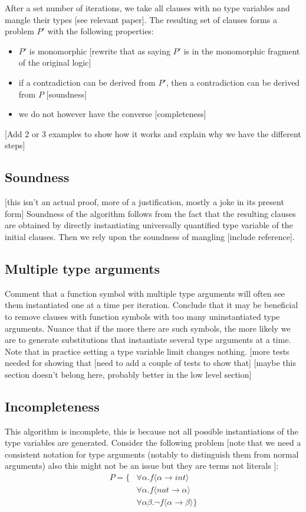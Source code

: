 \documentclass{article}
\begin{document}
After a set number of iterations, we take all clauses with no type variables and mangle their types [see relevant paper]. The resulting set of clauses forms a problem \(P'\) with the following properties:
\begin{itemize}
   \item \(P'\) is monomorphic [rewrite that as saying \(P'\) is in the monomorphic fragment of the original logic]
   \item if a contradiction can be derived from \(P'\), then a contradiction can be derived from \(P\) [soundness]
   \item we do not however have the converse [completeness]
\end{itemize}

[Add 2 or 3 examples to show how it works and explain why we have the different steps]

\subsection{Soundness}
[this isn't an actual proof, more of a justification, mostly a joke in its present form]
Soundness of the algorithm follows from the fact that the resulting clauses are obtained by directly instantiating universally quantified type variable of the initial clauses. Then we rely upon the soundness of mangling [include reference].

\subsection{Multiple type arguments}
Comment that a function symbol with multiple type arguments will often see them instantiated one at a time per iteration. Conclude that it may be beneficial to remove clauses with function symbols with too many uninstantiated type arguments. Nuance that if the more there are such symbols, the more likely we are to generate substitutions that instantiate several type arguments at a time. Note that in practice setting a type variable limit changes nothing.
[more tests needed for showing that
[need to add a couple of tests to show that]
[maybe this section doesn't belong here, probably better in the low level section]

\subsection{Incompleteness}

This algorithm is incomplete, this is because not all possible instantiations of the type variables are generated.
Consider the following problem [note that we need a consistent notation for type arguments (notably to distinguish them from normal arguments) also this might not be an issue but they are terms not literals ]: 
\begin{align*}
   P = \{ & \forall \alpha. f \langle \alpha \rightarrow int \rangle \\
          & \forall \alpha. f \langle nat \rightarrow \alpha \rangle \\
          & \forall \alpha \beta. \lnot f \langle \alpha \rightarrow \beta \rangle \}
\end{align*}
\end{document}
